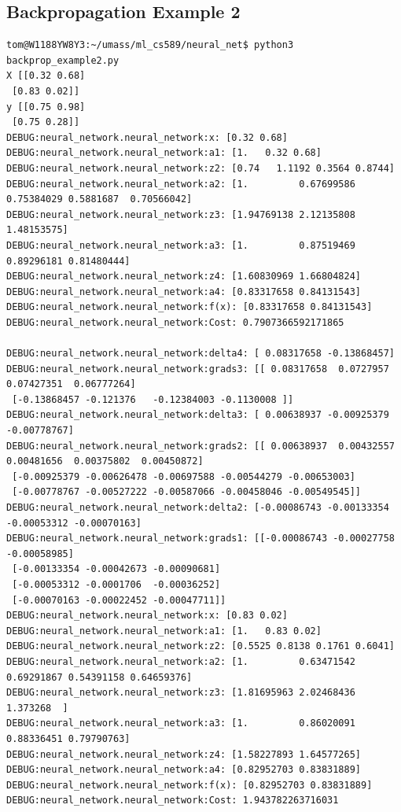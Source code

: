 \documentclass[letterpaper]{article}
\begin{document}
\subsection{Backpropagation Example 2}
\begin{verbatim}
tom@W1188YW8Y3:~/umass/ml_cs589/neural_net$ python3 backprop_example2.py 
X [[0.32 0.68]
 [0.83 0.02]]
y [[0.75 0.98]
 [0.75 0.28]]
DEBUG:neural_network.neural_network:x: [0.32 0.68]
DEBUG:neural_network.neural_network:a1: [1.   0.32 0.68]
DEBUG:neural_network.neural_network:z2: [0.74   1.1192 0.3564 0.8744]
DEBUG:neural_network.neural_network:a2: [1.         0.67699586 0.75384029 0.5881687  0.70566042]
DEBUG:neural_network.neural_network:z3: [1.94769138 2.12135808 1.48153575]
DEBUG:neural_network.neural_network:a3: [1.         0.87519469 0.89296181 0.81480444]
DEBUG:neural_network.neural_network:z4: [1.60830969 1.66804824]
DEBUG:neural_network.neural_network:a4: [0.83317658 0.84131543]
DEBUG:neural_network.neural_network:f(x): [0.83317658 0.84131543]
DEBUG:neural_network.neural_network:Cost: 0.7907366592171865

DEBUG:neural_network.neural_network:delta4: [ 0.08317658 -0.13868457]
DEBUG:neural_network.neural_network:grads3: [[ 0.08317658  0.0727957   0.07427351  0.06777264]
 [-0.13868457 -0.121376   -0.12384003 -0.1130008 ]]
DEBUG:neural_network.neural_network:delta3: [ 0.00638937 -0.00925379 -0.00778767]
DEBUG:neural_network.neural_network:grads2: [[ 0.00638937  0.00432557  0.00481656  0.00375802  0.00450872]
 [-0.00925379 -0.00626478 -0.00697588 -0.00544279 -0.00653003]
 [-0.00778767 -0.00527222 -0.00587066 -0.00458046 -0.00549545]]
DEBUG:neural_network.neural_network:delta2: [-0.00086743 -0.00133354 -0.00053312 -0.00070163]
DEBUG:neural_network.neural_network:grads1: [[-0.00086743 -0.00027758 -0.00058985]
 [-0.00133354 -0.00042673 -0.00090681]
 [-0.00053312 -0.0001706  -0.00036252]
 [-0.00070163 -0.00022452 -0.00047711]]
DEBUG:neural_network.neural_network:x: [0.83 0.02]
DEBUG:neural_network.neural_network:a1: [1.   0.83 0.02]
DEBUG:neural_network.neural_network:z2: [0.5525 0.8138 0.1761 0.6041]
DEBUG:neural_network.neural_network:a2: [1.         0.63471542 0.69291867 0.54391158 0.64659376]
DEBUG:neural_network.neural_network:z3: [1.81695963 2.02468436 1.373268  ]
DEBUG:neural_network.neural_network:a3: [1.         0.86020091 0.88336451 0.79790763]
DEBUG:neural_network.neural_network:z4: [1.58227893 1.64577265]
DEBUG:neural_network.neural_network:a4: [0.82952703 0.83831889]
DEBUG:neural_network.neural_network:f(x): [0.82952703 0.83831889]
DEBUG:neural_network.neural_network:Cost: 1.943782263716031


\end{verbatim}
\end{document}
